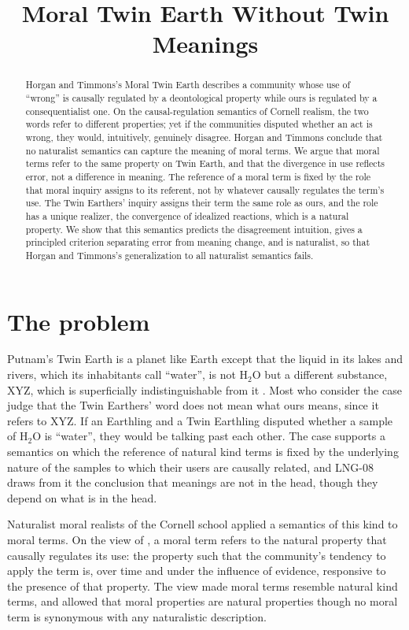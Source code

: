 \documentclass{situationist-preprint}
\title{Moral Twin Earth Without Twin Meanings}
\begin{document}
\maketitle

\begin{abstract}
Horgan and Timmons's Moral Twin Earth describes a community whose use of \enquote{wrong} is causally regulated by a deontological property while ours is regulated by a consequentialist one. On the causal-regulation semantics of Cornell realism, the two words refer to different properties; yet if the communities disputed whether an act is wrong, they would, intuitively, genuinely disagree. Horgan and Timmons conclude that no naturalist semantics can capture the meaning of moral terms. We argue that moral terms refer to the same property on Twin Earth, and that the divergence in use reflects error, not a difference in meaning. The reference of a moral term is fixed by the role that moral inquiry assigns to its referent, not by whatever causally regulates the term's use. The Twin Earthers' inquiry assigns their term the same role as ours, and the role has a unique realizer, the convergence of idealized reactions, which is a natural property. We show that this semantics predicts the disagreement intuition, gives a principled criterion separating error from meaning change, and is naturalist, so that Horgan and Timmons's generalization to all naturalist semantics fails.
\end{abstract}

\section{The problem}

Putnam's Twin Earth is a planet like Earth except that the liquid in its lakes and rivers, which its inhabitants call \enquote{water}, is not H$_2$O but a different substance, XYZ, which is superficially indistinguishable from it \citep{Putnam1975}. Most who consider the case judge that the Twin Earthers' word does not mean what ours means, since it refers to XYZ. If an Earthling and a Twin Earthling disputed whether a sample of H$_2$O is \enquote{water}, they would be talking past each other. The case supports a semantics on which the reference of natural kind terms is fixed by the underlying nature of the samples to which their users are causally related, and LNG-08 draws from it the conclusion that meanings are not in the head, though they depend on what is in the head.

Naturalist moral realists of the Cornell school applied a semantics of this kind to moral terms. On the view of \citet{Boyd1988}, a moral term refers to the natural property that causally regulates its use: the property such that the community's tendency to apply the term is, over time and under the influence of evidence, responsive to the presence of that property. The view made moral terms resemble natural kind terms, and allowed that moral properties are natural properties though no moral term is synonymous with any naturalistic description.
\end{document}
